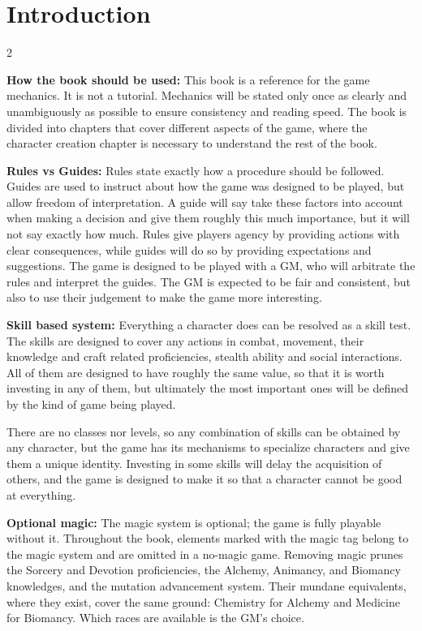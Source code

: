 \chapter{Introduction}

\begin{multicols}{2}


\textbf{How the book should be used:} This book is a reference for the game mechanics. It is not a tutorial. Mechanics will be stated only once as clearly and unambiguously as possible to ensure consistency and reading speed. The book is divided into chapters that cover different aspects of the game, where the character creation chapter is necessary to understand the rest of the book.

\textbf{Rules vs Guides:} Rules state exactly how a procedure should be followed. Guides are used to instruct about how the game was designed to be played, but allow freedom of interpretation. A guide will say take these factors into account when making a decision and give them roughly this much importance, but it will not say exactly how much. Rules give players agency by providing actions with clear consequences, while guides will do so by providing expectations and suggestions. The game is designed to be played with a GM, who will arbitrate the rules and interpret the guides. The GM is expected to be fair and consistent, but also to use their judgement to make the game more interesting.

\textbf{Skill based system:} Everything a character does can be resolved as a skill test. The skills are designed to cover any actions in combat, movement, their knowledge and craft related proficiencies, stealth ability and social interactions. All of them are designed to have roughly the same value, so that it is worth investing in any of them, but ultimately the most important ones will be defined by the kind of game being played. 

There are no classes nor levels, so any combination of skills can be obtained by any character, but the game has its mechanisms to specialize characters and give them a unique identity. Investing in some skills will delay the acquisition of others, and the game is designed to make it so that a character cannot be good at everything. 

\textbf{Optional magic:} The magic system is optional; the game is fully playable without it. Throughout the book, elements marked with the magic tag belong to the magic system and are omitted in a no-magic game. Removing magic prunes the Sorcery and Devotion proficiencies, the Alchemy, Animancy, and Biomancy knowledges, and the mutation advancement system. Their mundane equivalents, where they exist, cover the same ground: Chemistry for Alchemy and Medicine for Biomancy. Which races are available is the GM's choice.


\end{multicols}

